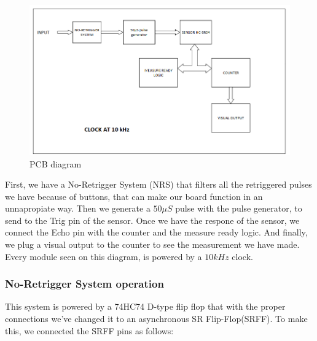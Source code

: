\begin{figure}[h!]
\begin{centering}
\includegraphics[scale=0.5]{../Exercise8/Informe/images/Diagrama_a_gran_escala}
\par\end{centering}
\caption{\color{cyan}PCB diagram}

\label{8_3}
\end{figure}

First, we have a No-Retrigger System (NRS) that filters all the retriggered
pulses we have because of buttons, that can make our board function
in an unnapropiate way. Then we generate a $50\mu S$ pulse with the
pulse generator, to send to the Trig pin of the sensor. Once we have
the respone of the sensor, we connect the Echo pin with the counter
and the measure ready logic. And finally, we plug a visual output
to the counter to see the measurement we have made. Every module seen
on this diagram, is powered by a $10kHz$ clock.

\subsubsection{\color{red}No-Retrigger System operation}

This system is powered by a 74HC74 D-type flip flop that with the
proper connections we've changed it to an asynchronous SR Flip-Flop(SRFF).
To make this, we connected the SRFF pins as follows:

